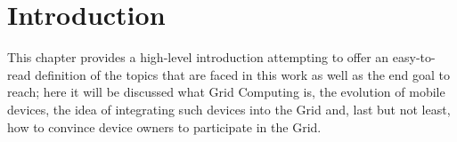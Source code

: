 \chapter{Introduction}
This chapter provides a high-level introduction attempting to offer an easy-to-read definition of the topics that are faced in this work as well as the end goal to reach; here it will be discussed what Grid Computing is, the evolution of mobile devices, the idea of integrating such devices into the Grid and, last but not least, how to convince device owners to participate in the Grid.





